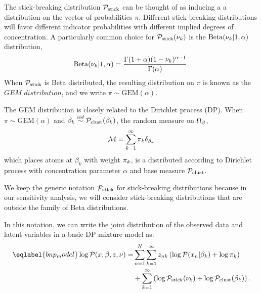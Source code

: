 The stick-breaking distribution $\mathcal{P}_{\mathrm{stick}}$ can be thought of as inducing a
a distribution on the vector of probabilities $\pi$. Different
stick-breaking distributions will favor different indicator probabilities
with different implied degrees of concentration.
A particularly common choice for
$\mathcal{P}_{\mathrm{stick}}(\nu_{k})$ is the $\mathrm{Beta}(\nu_{k} \vert 1, \alpha)$ distribution,
%
\begin{align*}
%
\mathrm{Beta}(\nuk \vert 1, \alpha) =
    \frac{\Gamma(1 + \alpha) (1 - \nuk)^{\alpha - 1}}
         {\Gamma(\alpha)}.
%
\end{align*}
%
When $\mathcal{P}_{\mathrm{stick}}$ is Beta distributed, the resulting distribution on $\pi$ is known as the
$\textit{GEM distribution}$, and we write $\pi \sim \mathrm{GEM}(\alpha)$.

The GEM distribution is closely related to the Dirichlet process (DP).
When $\pi \sim \mathrm{GEM}(\alpha)$ and
$\beta_k \overset{iid}{\sim} \mathcal{P}_{\mathrm{clust}}(\beta_k)$,
the random measure on $\Omega_{\beta}$,
\begin{align*}
  \mathcal{M} = \sum_{k = 1}^\infty \pi_k\delta_{\beta_k}
\end{align*}
which places atoms at $\beta_k$ with weight $\pi_k$,
is a distributed according to Dirichlet process with concentration parameter $\alpha$
and base measure $\mathcal{P}_{\mathrm{clust}}$.

We keep the generic notation $\mathcal{P}_{\mathrm{stick}}$ for stick-breaking distributions
because in our sensitivity analysis,
we will consider stick-breaking distributions that are outside the
family of Beta distributions.

In this notation, we can write the joint distribution of
the observed data and latent variables in a basic DP mixture model as:
%
\begin{align}\eqlabel{bnp_model}
%
\logp(\x, \beta, \z, \nu) =&
\sum_{n=1}^N \sum_{k=1}^{\infty}
    \z_{\n\k} \left(
        \logp(\x_n \vert \beta_\k) + \log \pi_\k
    \right)
\nonumber\\
   & +
    \sum_{k=1}^{\infty} \left(
        \log \pstick(\nuk) + \log \pbetaprior(\beta_\k)
    \right).
%
\end{align}
%

